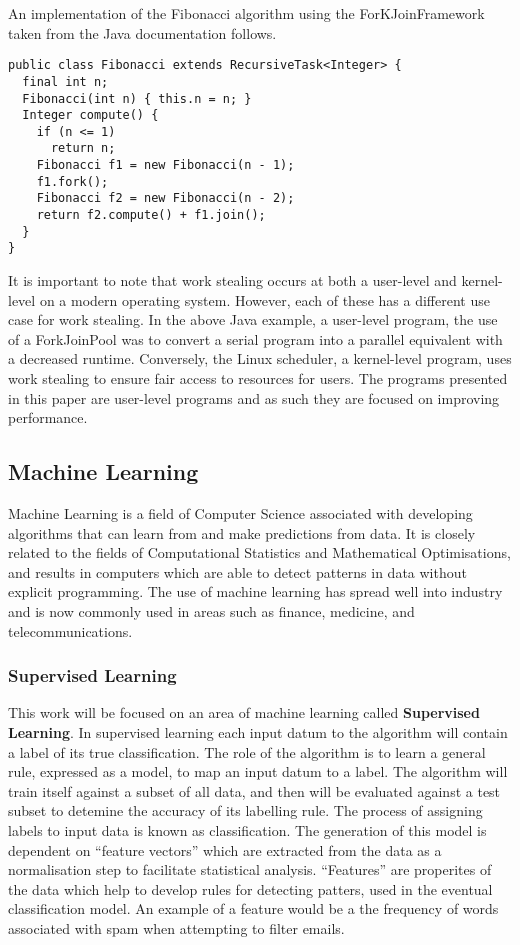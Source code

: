 \documentclass[12pt]{article}
\begin{document}
\newpage

An implementation of the Fibonacci algorithm using the ForKJoinFramework taken from the Java documentation follows.
\newline
\begin{lstlisting}
public class Fibonacci extends RecursiveTask<Integer> {
  final int n;
  Fibonacci(int n) { this.n = n; }
  Integer compute() {
    if (n <= 1)
      return n;
    Fibonacci f1 = new Fibonacci(n - 1);
    f1.fork();
    Fibonacci f2 = new Fibonacci(n - 2);
    return f2.compute() + f1.join();
  }
}
\end{lstlisting}


It is important to note that work stealing occurs at both a user-level and kernel-level on a modern operating system. However, each of these has a different use case for work stealing. In the above Java example, a user-level program, the use of a ForkJoinPool was to convert a serial program into a parallel equivalent with a decreased runtime. Conversely, the Linux scheduler, a kernel-level program, uses work stealing to ensure fair access to resources for users. The programs presented in this paper are user-level programs and as such they are focused on improving performance.

\newpage

\subsection{Machine Learning}
Machine Learning is a field of Computer Science associated with developing algorithms that can learn from and make predictions from data\cite{machineLearningDef}. It is closely related to the fields of Computational Statistics and Mathematical Optimisations, and results in computers which are able to detect patterns in data without explicit programming. The use of machine learning has spread well into industry and is now commonly used in areas such as finance, medicine, and telecommunications.
\newline
\subsubsection{Supervised Learning}
This work will be focused on an area of machine learning called \textbf{Supervised Learning}. In supervised learning each input datum to the algorithm will contain a label of its true classification. The role of the algorithm is to learn a general rule, expressed as a model, to map an input datum to a label. The algorithm will train itself against a subset of all data, and then will be evaluated against a test subset to detemine the accuracy of its labelling rule. The process of assigning labels to input data is known as classification.
\newline
\newline
The generation of this model is dependent on ``feature vectors'' which are extracted from the data as a normalisation step to facilitate statistical analysis. ``Features'' are properites of the data which help to develop rules for detecting patters, used in the eventual classification model. An example of a feature would be a the frequency of words associated with spam when attempting to filter emails.
\newline
\end{document}
